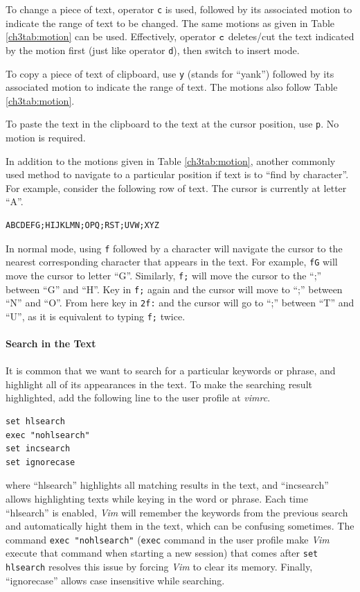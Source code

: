 To change a piece of text, operator \verb|c| is used, followed by its associated motion to indicate the range of text to be changed. The same motions as given in Table \ref{ch3tab:motion} can be used. Effectively, operator $\verb|c|$ deletes/cut the text indicated by the motion first (just like operator \verb|d|), then switch to insert mode.

To copy a piece of text of clipboard, use \verb|y| (stands for ``yank'') followed by its associated motion to indicate the range of text. The motions also follow Table \ref{ch3tab:motion}.

To paste the text in the clipboard to the text at the cursor position, use \verb|p|. No motion is required.

In addition to the motions given in Table \ref{ch3tab:motion}, another commonly used method to navigate to a particular position if text is to ``find by character''. For example, consider the following row of text. The cursor is currently at letter ``A''.
\begin{verbatim}
ABCDEFG;HIJKLMN;OPQ;RST;UVW;XYZ
\end{verbatim}
In normal mode, using \verb|f| followed by a character will navigate the cursor to the nearest corresponding character that appears in the text. For example, \verb|fG| will move the cursor to letter ``G''. Similarly, \verb|f;| will move the cursor to the ``;'' between ``G'' and ``H''. Key in \verb|f;| again and the cursor will move to ``;'' between ``N'' and ``O''. From here key in \verb|2f:| and the cursor will go to ``;'' between ``T'' and ``U'', as it is equivalent to typing \verb|f;| twice.
\\
\\
\noindent \textbf{Search in the Text}
\\
\\
It is common that we want to search for a particular keywords or phrase, and highlight all of its appearances in the text. To make the searching result highlighted, add the following line to the user profile at \textit{vimrc}.
\begin{verbatim}
set hlsearch
exec "nohlsearch"
set incsearch
set ignorecase
\end{verbatim}
where ``hlsearch'' highlights all matching results in the text, and ``incsearch'' allows highlighting texts while keying in the word or phrase. Each time ``hlsearch'' is enabled, \textit{Vim} will remember the keywords from the previous search and automatically hight them in the text, which can be confusing sometimes. The command \verb|exec "nohlsearch"| (\verb|exec| command in the user profile make \textit{Vim} execute that command when starting a new session) that comes after \verb|set hlsearch| resolves this issue by forcing \textit{Vim} to clear its memory. Finally, ``ignorecase'' allows case insensitive while searching.

